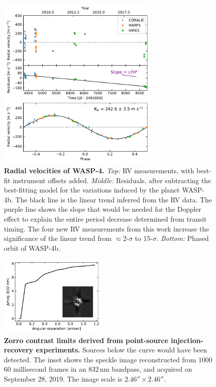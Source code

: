 \documentclass[12pt,twocolumn,tighten,trackchanges]{aastex62}
\begin{document}
\begin{figure}[t]
	\begin{center}
		\leavevmode
		\includegraphics[width=0.7\textwidth]{f2.pdf}
	\end{center}
	\vspace{-0.7cm}
	\caption{
		{\bf Radial velocities of WASP-4.}
		{\it Top:} RV measurements, with best-fit instrument offsets
		added. 
		{\it Middle:}
		Residuals, after subtracting the best-fitting model for the
		variations induced by the planet WASP-4b. The black line is the
		linear trend inferred from the RV data.  The purple line shows the
		slope that would be needed for the Doppler effect to explain the
		entire period decrease determined from transit timing.  The four
		new RV measurements from this work increase the significance of
		the linear trend from $\approx$2-$\sigma$ to 15-$\sigma$.
		{\it Bottom:}
		Phased orbit of WASP-4b.
		\label{fig:rvs}
		\vspace{-0.0cm}
	}
\end{figure}


\begin{figure}[!t]
	\begin{center}
		\leavevmode
		\includegraphics[width=0.47\textwidth]{f3.pdf}
	\end{center}
	\vspace{-0.7cm}
	\caption{
		{\bf Zorro contrast limits derived from point-source
			injection-recovery experiments.} Sources below the curve would
		have been detected.  The inset shows the speckle image
		reconstructed from 1000 60 millisecond frames in an 832$\,$nm
		bandpass, and acquired on September 28, 2019.  The image scale
		is $2.46''\times2.46''$.
	}
	\label{fig:zorro}
\end{figure}
\end{document}
